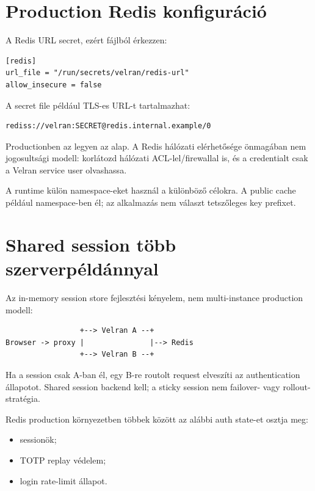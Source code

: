 \section{Production Redis konfiguráció}

A Redis URL secret, ezért fájlból érkezzen:

\begin{lstlisting}
[redis]
url_file = "/run/secrets/velran/redis-url"
allow_insecure = false
\end{lstlisting}

A secret file például TLS-es URL-t tartalmazhat:

\begin{lstlisting}
rediss://velran:SECRET@redis.internal.example/0
\end{lstlisting}

Productionben az  legyen az alap. A Redis hálózati elérhetősége önmagában nem jogosultsági modell: korlátozd hálózati ACL-lel/firewallal is, és a credentialt csak a Velran service user olvashassa.

A runtime külön namespace-eket használ a különböző célokra. A public cache például  namespace-ben él; az alkalmazás nem választ tetszőleges key prefixet.

\section{Shared session több szerverpéldánnyal}

Az in-memory session store fejlesztési kényelem, nem multi-instance production modell:

\begin{lstlisting}
                 +--> Velran A --+
Browser -> proxy |               |--> Redis
                 +--> Velran B --+
\end{lstlisting}

Ha a session csak A-ban él, egy B-re routolt request elveszíti az authentication állapotot. Shared session backend kell; a sticky session nem failover- vagy rollout-stratégia.

Redis production környezetben többek között az alábbi auth state-et osztja meg:

\begin{itemize}
  \item sessionök;
  \item TOTP replay védelem;
  \item login rate-limit állapot.
\end{itemize}

